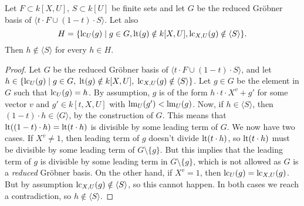 \begin{lemma}\label{lem:LC_U_notin_S}
  Let $F \subset k[X, U]$, $S \subset k[U]$ be finite sets and let $G$ be the reduced Gröbner basis of $\langle t \cdot F \cup (1 - t) \cdot S \rangle$. Let also
  \[H = \{\operatorname{lc}_{U}(g) \mid g \in G, \operatorname{lt}(g) \notin k[X, U], \operatorname{lc}_{X, U}(g) \notin \langle S \rangle\}.\]
  Then $h \notin \langle S \rangle$ for every $h \in H$.
\end{lemma}
\begin{proof}
  Let $G$ be the reduced Gröbner basis of $\langle t\cdot F \cup (1-t)\cdot S\rangle$, and let $h \in \{\operatorname{lc}_{U}(g) \mid g \in G,\; \operatorname{lt}(g) \notin k[X, U],\; \operatorname{lc}_{X, U}(g) \notin \langle S \rangle\}$. Let $g \in G$ be the element in $G$ such that $\operatorname{lc}_{U}(g) = h$. By assumption, $g$ is of the form $h \cdot t \cdot X^{v} + g'$ for some vector $v$ and $g' \in k[t, X, U]$ with $\operatorname{lm}_{U}(g') < \operatorname{lm}_{U}(g)$. Now, if $h \in \langle S \rangle$, then $(1-t) \cdot h \in \langle G \rangle$, by the construction of $G$. This means that $\operatorname{lt}((1-t)\cdot h) = \operatorname{lt}(t \cdot h)$ is divisible by some leading term of $G$. We now have two cases. If $X^{v} \neq 1$, then leading term of $g$ doesn't divide $\operatorname{lt}(t \cdot h)$, so $\operatorname{lt}(t \cdot h)$ must be divisible by some leading term of $G \setminus \{g\}$. But this implies that the leading term of $g$ is divisible by some leading term in $G \setminus \{g\}$, which is not allowed as $G$ is a \textit{reduced} Gröbner basis. On the other hand, if $X^{v} = 1$, then $\operatorname{lc}_{U}(g) = \operatorname{lc}_{X, U}(g)$. But by assumption $\operatorname{lc}_{X, U}(g) \notin \langle S \rangle$, so this cannot happen. In both cases we reach a contradiction, so $h \notin \langle S \rangle$.
\end{proof}

